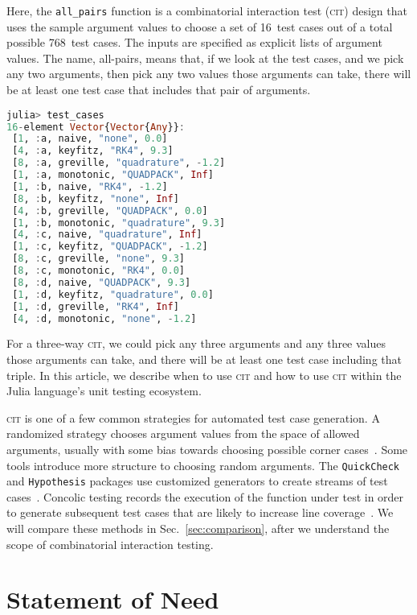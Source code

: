 \documentclass{juliacon}
\newcommand{\cit}{\textsc{cit}\xspace}
\begin{document}
Here, the \verb|all_pairs| function is a combinatorial interaction test (\cit) design that uses the sample argument values to choose a set of 16~test cases out of a total possible 768~test cases. The inputs are specified as explicit lists of argument values. The name, all-pairs, means that, if we look at the test cases, and we pick any two arguments, then pick any two values those arguments can take, there will be at least one test case that includes that pair of arguments.
\begin{lstlisting}[language=Julia]
julia> test_cases
16-element Vector{Vector{Any}}:
 [1, :a, naive, "none", 0.0]
 [4, :a, keyfitz, "RK4", 9.3]
 [8, :a, greville, "quadrature", -1.2]
 [1, :a, monotonic, "QUADPACK", Inf]
 [1, :b, naive, "RK4", -1.2]
 [8, :b, keyfitz, "none", Inf]
 [4, :b, greville, "QUADPACK", 0.0]
 [1, :b, monotonic, "quadrature", 9.3]
 [4, :c, naive, "quadrature", Inf]
 [1, :c, keyfitz, "QUADPACK", -1.2]
 [8, :c, greville, "none", 9.3]
 [8, :c, monotonic, "RK4", 0.0]
 [8, :d, naive, "QUADPACK", 9.3]
 [1, :d, keyfitz, "quadrature", 0.0]
 [1, :d, greville, "RK4", Inf]
 [4, :d, monotonic, "none", -1.2]
\end{lstlisting}
For a three-way \cit, we could pick any three arguments and any three values those arguments can take, and there will be at least one test case including that triple. In this article, we describe when to use \cit and how to use \cit within the Julia language's unit testing ecosystem.

\vskip 6pt
\cit is one of a few common strategies for automated test case generation. A randomized strategy chooses argument values from the space of allowed arguments, usually with some bias towards choosing possible corner cases~\cite{Lampropoulos2020-sd,Arcuri2012-az}. Some tools introduce more structure to choosing random arguments. The \texttt{QuickCheck} and \texttt{Hypothesis} packages use customized generators to create streams of test cases~\cite{loscher2018automating}. Concolic testing records the execution of the function under test in order to generate subsequent test cases that are likely to increase line coverage~\cite{King1976-jt,Wang2018-xh,vira2019}. We will compare these methods in Sec.~\ref{sec:comparison}, after we understand the scope of combinatorial interaction testing.


\section{Statement of Need}\label{sec:statement-of-need}
\end{document}
